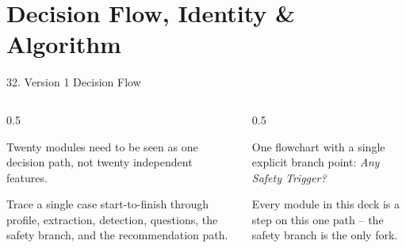 \documentclass[9pt,aspectratio=169]{beamer}
\begin{document}
\section{Decision Flow, Identity \& Algorithm}

\begin{frame}{32. Version 1 Decision Flow}
\begin{columns}[T,onlytextwidth]
\begin{column}{0.5\textwidth}
\begin{tcolorbox}[colback=blue!7,colframe=blue!55!black,title=\textbf{Motivation},boxrule=0.6pt,arc=1mm,left=5pt,right=5pt,top=3pt,bottom=3pt,fonttitle=\small]
\footnotesize Twenty modules need to be seen as one decision path, not twenty independent features.
\end{tcolorbox}
\vspace{5pt}
\begin{tcolorbox}[colback=teal!7,colframe=teal!55!black,title=\textbf{Method},boxrule=0.6pt,arc=1mm,left=5pt,right=5pt,top=3pt,bottom=3pt,fonttitle=\small]
\footnotesize Trace a single case start-to-finish through profile, extraction, detection, questions, the safety branch, and the recommendation path.
\end{tcolorbox}
\end{column}
\begin{column}{0.5\textwidth}
\begin{tcolorbox}[colback=green!8,colframe=green!45!black,title=\textbf{Result},boxrule=0.6pt,arc=1mm,left=5pt,right=5pt,top=3pt,bottom=3pt,fonttitle=\small]
\footnotesize One flowchart with a single explicit branch point: \textit{Any Safety Trigger?}
\end{tcolorbox}
\vspace{5pt}
\begin{tcolorbox}[colback=orange!10,colframe=orange!65!black,title=\textbf{Conclusion},boxrule=0.6pt,arc=1mm,left=5pt,right=5pt,top=3pt,bottom=3pt,fonttitle=\small]
\footnotesize Every module in this deck is a step on this one path -- the safety branch is the only fork.
\end{tcolorbox}
\end{column}
\end{columns}
\end{frame}
\end{document}
